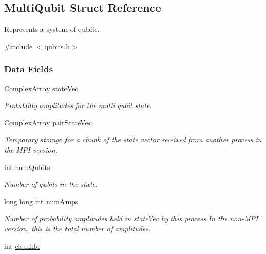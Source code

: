 \hypertarget{structMultiQubit}{
\subsection{MultiQubit Struct Reference}
\label{structMultiQubit}
}


Represents a system of qubits.  


{\ttfamily \#include $<$qubits.h$>$}\subsubsection*{Data Fields}
\begin{DoxyCompactItemize}
\item 
\hyperlink{structComplexArray}{ComplexArray} \hyperlink{structMultiQubit_a45483190d6b01ef6b2f98f2bec9ab94f}{stateVec}
\begin{DoxyCompactList}\small\item\em Probablilty amplitudes for the multi qubit state. \item\end{DoxyCompactList}\item 
\hyperlink{structComplexArray}{ComplexArray} \hyperlink{structMultiQubit_a76f7db4eab52d2b30f58f973ada809c5}{pairStateVec}
\begin{DoxyCompactList}\small\item\em Temporary storage for a chunk of the state vector received from another process in the MPI version. \item\end{DoxyCompactList}\item 
int \hyperlink{structMultiQubit_ab5b9795bdc6fb5855e1974dcbbaeb36f}{numQubits}
\begin{DoxyCompactList}\small\item\em Number of qubits in the state. \item\end{DoxyCompactList}\item 
long long int \hyperlink{structMultiQubit_ae16f47d8b725c914fb7f66b6498d79db}{numAmps}
\begin{DoxyCompactList}\small\item\em Number of probability amplitudes held in stateVec by this process In the non-\/MPI version, this is the total number of amplitudes. \item\end{DoxyCompactList}\item 
int \hyperlink{structMultiQubit_ab10c88249fa3825d6227ceec01d37e37}{chunkId}

\end{DoxyCompactItemize}

